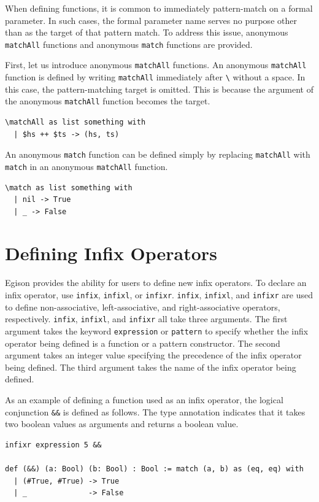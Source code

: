 When defining functions, it is common to immediately pattern-match on a formal parameter.
In such cases, the formal parameter name serves no purpose other than as the target of that pattern match.
To address this issue, anonymous \lstinline{matchAll} functions and anonymous \lstinline{match} functions are provided.

First, let us introduce anonymous \lstinline{matchAll} functions.
An anonymous \lstinline{matchAll} function is defined by writing \lstinline{matchAll} immediately after \lstinline{\} without a space.
In this case, the pattern-matching target is omitted.
This is because the argument of the anonymous \lstinline{matchAll} function becomes the target.
\begin{lstlisting}[language=egison,numbers=none]
\matchAll as list something with
  | $hs ++ $ts -> (hs, ts)
\end{lstlisting}

An anonymous \lstinline{match} function can be defined simply by replacing \lstinline{matchAll} with \lstinline{match} in an anonymous \lstinline{matchAll} function.
\begin{lstlisting}[language=egison,numbers=none]
\match as list something with
  | nil -> True
  | _ -> False
\end{lstlisting}

\section{Defining Infix Operators}

Egison provides the ability for users to define new infix operators.
To declare an infix operator, use \lstinline{infix}, \lstinline{infixl}, or \lstinline{infixr}.
\lstinline{infix}, \lstinline{infixl}, and \lstinline{infixr} are used to define non-associative, left-associative, and right-associative operators, respectively.
\lstinline{infix}, \lstinline{infixl}, and \lstinline{infixr} all take three arguments.
The first argument takes the keyword \lstinline{expression} or \lstinline{pattern} to specify whether the infix operator being defined is a function or a pattern constructor.
The second argument takes an integer value specifying the precedence of the infix operator being defined.
The third argument takes the name of the infix operator being defined.

As an example of defining a function used as an infix operator, the logical conjunction \lstinline{&&} is defined as follows.
The type annotation indicates that it takes two boolean values as arguments and returns a boolean value.
\begin{lstlisting}[language=egison,numbers=none]
infixr expression 5 &&

def (&&) (a: Bool) (b: Bool) : Bool := match (a, b) as (eq, eq) with
  | (#True, #True) -> True
  | _              -> False
\end{lstlisting}

